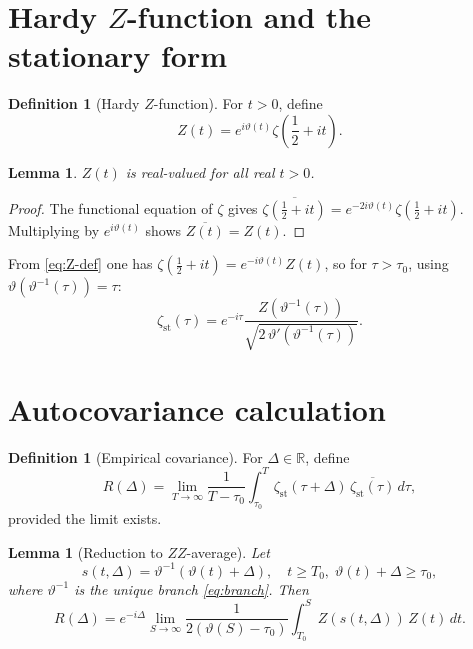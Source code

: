 \documentclass[11pt]{article}
\numberwithin{equation}{section}
\theoremstyle{plain}
\newtheorem{lemma}[theorem]{Lemma}
\theoremstyle{definition}
\newtheorem{definition}[theorem]{Definition}
\begin{document}
\section{Hardy \(Z\)-function and the stationary form}

\begin{definition}[Hardy \(Z\)-function]
For \(t>0\), define
\begin{equation}
Z(t)=e^{i\vartheta(t)}\zeta\!\left(\frac12+it\right).
\label{eq:Z-def}
\end{equation}
\end{definition}

\begin{lemma}
\(Z(t)\) is real-valued for all real \(t>0\).
\end{lemma}

\begin{proof}
The functional equation of \(\zeta\) gives
\(\overline{\zeta(\frac12+it)}=e^{-2i\vartheta(t)}\zeta(\frac12+it)\).
Multiplying by \(e^{i\vartheta(t)}\) shows \(\overline{Z(t)}=Z(t)\).
\end{proof}

From \eqref{eq:Z-def} one has \(\zeta(\frac12+it)=e^{-i\vartheta(t)}Z(t)\), so for
\(\tau>\tau_0\), using \(\vartheta(\vartheta^{-1}(\tau))=\tau\):
\begin{equation}
\zeta_{\mathrm{st}}(\tau)
=
e^{-i\tau}
\frac{
Z(\vartheta^{-1}(\tau))
}{
\sqrt{2\,\vartheta'(\vartheta^{-1}(\tau))}
}.
\label{eq:zeta-st-via-Z}
\end{equation}

\section{Autocovariance calculation}

\begin{definition}[Empirical covariance]
For \(\Delta\in\mathbb{R}\), define
\begin{equation}
R(\Delta)
=
\lim_{T\to\infty}
\frac{1}{T-\tau_0}
\int_{\tau_0}^T
\zeta_{\mathrm{st}}(\tau+\Delta)\,
\overline{\zeta_{\mathrm{st}}(\tau)}\,d\tau,
\label{eq:R-def}
\end{equation}
provided the limit exists.
\end{definition}

\begin{lemma}[Reduction to \(ZZ\)-average]
Let
\begin{equation}
s(t,\Delta)=\vartheta^{-1}(\vartheta(t)+\Delta),
\quad t\ge T_0,\;\vartheta(t)+\Delta\ge\tau_0,
\label{eq:s-def}
\end{equation}
where \(\vartheta^{-1}\) is the unique branch \eqref{eq:branch}. Then
\begin{equation}
R(\Delta)
=
e^{-i\Delta}
\lim_{S\to\infty}
\frac{1}{2(\vartheta(S)-\tau_0)}
\int_{T_0}^S
Z(s(t,\Delta))\,Z(t)\,dt.
\label{eq:R-leading}
\end{equation}
\end{lemma}
\end{document}
